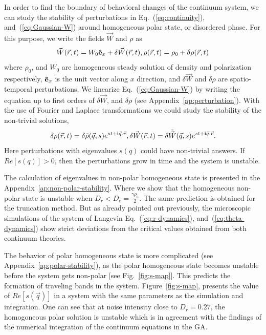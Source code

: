 \documentclass[reprint,floatfix,amsmath,amssymb,aps,pre,showkeys,showpacs,superscriptaddress]{revtex4-1}
\newcommand{\e}{{\bf \hat{e}}}
\newcommand{\im}{{\rm \bf i}}
\newcommand{\w}{W}
\newcommand{\vw}{\vec{\w}}
\newcommand{\req}[1]{Eq.~(\ref{#1})}
\newcommand{\reqs}[2]{Eq.~(\ref{#1}), and~(\ref{#2})}
\begin{document}
In order to find the boundary of behavioral changes of the continuum system, we can study the stability of perturbations in \reqs{eq:continuity}{eq:Gaussian-W} around homogeneous polar state, or disordered phase. For this purpose, we write the fields $\vw$ and $\rho$ as
\begin{equation}
\vw(\vec{r},t) = \w_0 \e_x + \delta \vw(\vec{r},t), \rho(\vec{r},t) = \rho_0 + \delta \rho(\vec{r},t)
\end{equation}
where $\rho_0$, and $\w_0$ are homogeneous steady solution of density and polarization respectively, $\e_x$ is the unit vector along $x$ direction, and $\delta \vw$ and $\delta \rho$ are spatio-temporal perturbations. We linearize \req{eq:Gaussian-W} by writing the equation up to first orders of $\delta \vw$, and $\delta \rho$ (see Appendix~\ref{ap:perturbation}). With the use of Fourier and Laplace transformations we could study the stability of the non-trivial solutions,
\begin{equation}
\delta \rho(\vec{r},t) = \delta \tilde{\rho}(\vec{q},s) e^{st + \im \vec{q}.\vec{r}}, \delta \vw(\vec{r},t) = \delta \tilde{\vw}(\vec{q},s) e^{st + \im \vec{q}.\vec{r}}.
\end{equation}
Here perturbations with eigenvalues $s(q)$ could have non-trivial answers. If $Re[s(q)] > 0$, then the perturbations grow in time and the system is unstable.

The calculation of eigenvalues in non-polar homogeneous state is presented in the Appendix~\ref{ap:non-polar-stability}. Where we show that the homogeneous non-polar state is unstable when $D_r < D_c = \frac{\gamma \rho_0}{2}$. The same prediction is obtained for the truncation method. But as already pointed out previously, the microscopic simulations of the system of  Langevin \reqs{eq:r-dynamics}{eq:theta-dynamics} show strict deviations from the critical values obtained from both continuum theories.

The behavior of polar homogeneous state is more complicated (see Appendix~\ref{ap:polar-stability}), as the polar homogeneous state becomes unstable before the system gets non-polar [see Fig.~\ref{fig:s-map}]. This predicts the formation of traveling bands in the system. Figure~\ref{fig:s-map}, presents the value of $Re[s(\vec{q})]$ in a system with the same parameters as the simulation and integration. One can see that at noise intensity close to $D_r=0.27$, the homogoneous polar solution is unstable which is in agreement with the findings of the numerical integration of the continuum equations in the GA.
\end{document}
